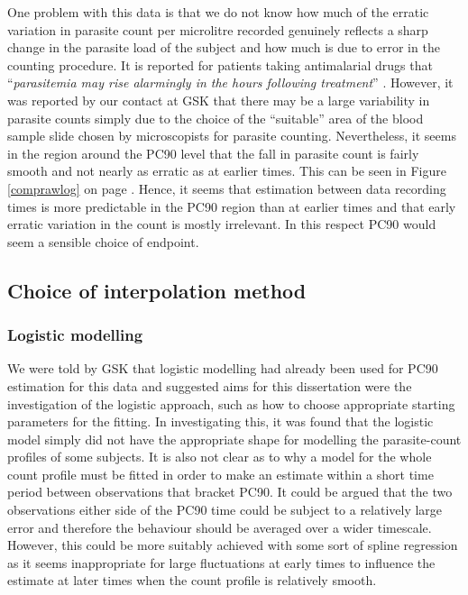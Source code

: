 One problem with this data is that we do not know how much of the erratic variation in parasite count per microlitre recorded genuinely reflects a sharp change in the parasite load of the subject and how much is due to error in the counting procedure. It is reported for patients taking antimalarial drugs that ``\textit{parasitemia may rise alarmingly in the hours following treatment}'' \cite{white}. However, it was reported by our contact at GSK that there may be a large variability in parasite counts simply due to the choice of the ``suitable'' area of the blood sample slide chosen by microscopists for parasite counting. Nevertheless, it seems in the region around the PC90 level that the fall in parasite count is fairly smooth and not nearly as erratic as at earlier times. This can be seen in Figure \ref{comprawlog} on page \pageref{comprawlog}. Hence, it seems that estimation between data recording times is more predictable in the PC90 region than at earlier times and that early erratic variation in the count is mostly irrelevant. In this respect PC90 would seem a sensible choice of endpoint.

\subsection{Choice of interpolation method}
\subsubsection*{Logistic modelling}
We were told by GSK that logistic modelling had already been used for PC90 estimation for this data and suggested aims for this dissertation were the investigation of the logistic approach, such as how to choose appropriate starting parameters for the fitting. In investigating this, it was found that the logistic model simply did not have the appropriate shape for modelling the parasite-count profiles of some subjects. It is also not clear as to why a model for the whole count profile must be fitted in order to make an estimate within a short time period between observations that bracket PC90. It could be argued that the two observations either side of the PC90 time could be subject to a relatively large error and therefore the behaviour should be averaged over a wider timescale. However, this could be more suitably achieved with some sort of spline regression as it seems inappropriate for large fluctuations at early times to influence the estimate at later times when the count profile is relatively smooth.


